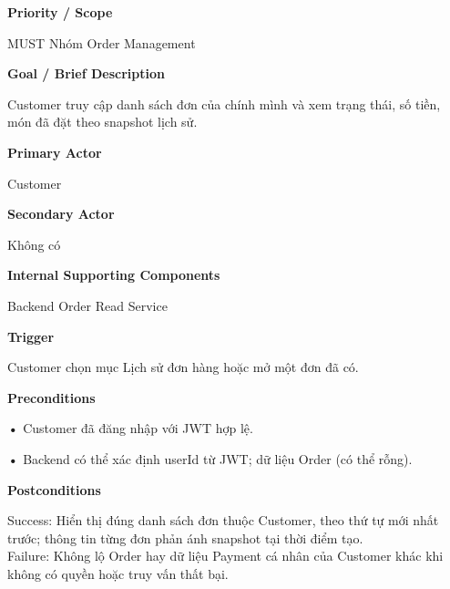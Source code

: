 \documentclass[11pt,a4paper,oneside]{report}
\begin{document}
\par\smallskip\noindent\textcolor{sgublue}{\textbf{Priority / Scope}}\par\nobreak
MUST \textbar{} Nhóm Order Management
\par

\par\smallskip\noindent\textcolor{sgublue}{\textbf{Goal / Brief Description}}\par\nobreak
Customer truy cập danh sách đơn của chính mình và xem trạng thái, số tiền, món đã đặt theo snapshot lịch sử.
\par

\par\smallskip\noindent\textcolor{sgublue}{\textbf{Primary Actor}}\par\nobreak
Customer
\par

\par\smallskip\noindent\textcolor{sgublue}{\textbf{Secondary Actor}}\par\nobreak
Không có
\par

\par\smallskip\noindent\textcolor{sgublue}{\textbf{Internal Supporting Components}}\par\nobreak
Backend Order Read Service
\par

\par\smallskip\noindent\textcolor{sgublue}{\textbf{Trigger}}\par\nobreak
Customer chọn mục Lịch sử đơn hàng hoặc mở một đơn đã có.
\par

\par\smallskip\noindent\textcolor{sgublue}{\textbf{Preconditions}}\par\nobreak
\textbf{•} Customer đã đăng nhập với JWT hợp lệ.

\textbf{•} Backend có thể xác định userId từ JWT; dữ liệu Order (có thể rỗng).
\par

\par\smallskip\noindent\textcolor{sgublue}{\textbf{Postconditions}}\par\nobreak
Success: Hiển thị đúng danh sách đơn thuộc Customer, theo thứ tự mới nhất trước; thông tin từng đơn phản ánh snapshot tại thời điểm tạo.\\
Failure: Không lộ Order hay dữ liệu Payment cá nhân của Customer khác khi không có quyền hoặc truy vấn thất bại.\strut
\par
\end{document}
